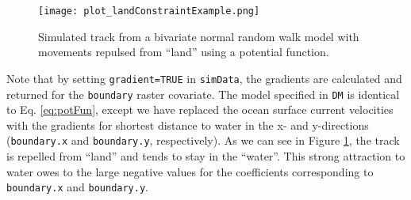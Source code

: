 \documentclass[12pt]{article}\usepackage[]{graphicx}\usepackage[]{xcolor}
\begin{document}
\begin{figure}[htbp]
  \centering
  \texttt{[image: plot\_landConstraintExample.png]}
  \caption{Simulated track from a bivariate normal random walk model with movements repulsed from ``land'' using a potential function.}
  \label{fig:landConstraint}
\end{figure}
Note that by setting \verb|gradient=TRUE| in \verb|simData|, the gradients are calculated and returned for the \verb|boundary| raster covariate. The model specified in \verb|DM| is identical to Eq. \ref{eq:potFun}, except we have replaced the ocean surface current velocities with the gradients for shortest distance to water in the x- and y-directions (\verb|boundary.x| and \verb|boundary.y|, respectively). As we can see in Figure \ref{fig:landConstraint}, the track is repelled from ``land'' and tends to stay in the ``water''. This strong attraction to water owes to the large negative values for the coefficients corresponding to \verb|boundary.x| and \verb|boundary.y|. 
\end{document}
